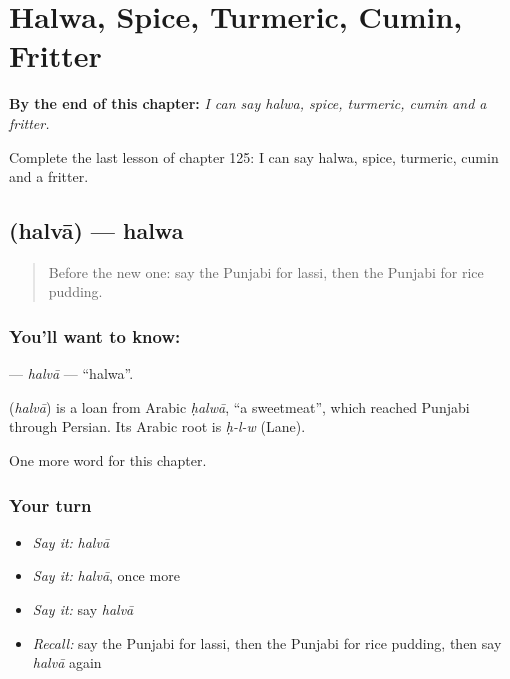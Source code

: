 
\chapter{Halwa, Spice, Turmeric, Cumin, Fritter}
\label{ch:pa-halwa-spice-turmeric-cumin-fritter}

\begin{chapteropening}
\textbf{By the end of this chapter:} \emph{I can say halwa, spice, turmeric, cumin and a fritter.}

Complete the last lesson of chapter 125: I can say halwa, spice, turmeric, cumin and a fritter.
\end{chapteropening}

\section[\texorpdfstring{\pa{ਹਲਵਾ} (halvā)}{ਹਲਵਾ (halvā)}]{ (halvā) — halwa}

\label{lesson:PA-C125-halva}



\begin{quote}
Before the new one: say the Punjabi for lassi, then the Punjabi for rice pudding.
\end{quote}

\subsection*{You'll want to know: }
\textbf{} — \emph{halvā} — \textquotedblleft{}halwa\textquotedblright{}.

\begin{cousinweb}
\textbf{} (\emph{halvā}) is a loan from Arabic \emph{ḥalwā}, \textquotedblleft{}a sweetmeat\textquotedblright{}, which reached Punjabi through Persian. Its Arabic root is \emph{ḥ-l-w} (Lane).
\end{cousinweb}

\begin{grammarlens}[title={What you've built}]
One more word for this chapter.
\end{grammarlens}

\subsection*{Your turn}
\begin{itemize}
\raggedright
  \item \emph{Say it:} \emph{halvā}
  \item \emph{Say it:} \emph{halvā}, once more
  \item \emph{Say it:} say \emph{halvā}
  \item \emph{Recall:} say the Punjabi for lassi, then the Punjabi for rice pudding, then say \emph{halvā} again
\end{itemize}

